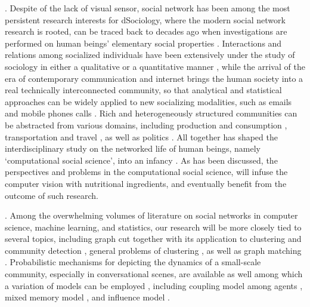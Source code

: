.  Despite of the lack of visual sensor, social network has been among the most persistent research interests for dSociology, where the modern social network research is rooted, can be traced back to decades ago when investigations are performed on human beings' elementary social properties \cite{Darwin,Thomkins,Goffman,Kendon1990,Ekman,Hoyle,Tannen}. Interactions and relations among socialized individuals have been extensively under the study of sociology in either a qualitative or a quantitative manner \cite{Goodwin2000,Goldin,Goodwin2007,Kendon2010}, while the arrival of the era of contemporary communication and internet brings the human society into a real technically interconnected community, so that analytical and statistical approaches can be widely applied to new socializing modalities, such as emails \cite{Eckmann} and mobile phones calls \cite{Onnela,Eagle}. Rich and heterogeneously structured communities can be abstracted from various domains, including production and consumption \cite{Watts}, transportation and travel \cite{Gonzalez},  as well as politics \cite{Iacus}. All together has shaped the interdisciplinary study on the networked life of human beings, namely `computational social science', into an infancy \cite{Lazer2009}. As has been discussed, the perspectives and problems in the computational social science, will infuse the computer vision with nutritional ingredients, and eventually benefit from the outcome of such research. 

. Among the overwhelming volumes of literature on social networks in computer science, machine learning, and statistics, our research will be more closely tied to several topics, including graph cut \cite{Boykov:segmentation} together with its application to clustering and community detection \cite{Ng:spectral,Filippone:clustering}, general problems of clustering \cite{Xu:clustering}, as well as graph matching \cite{West:Graph,Caetano:graph}. Probabilistic mechanisms for depicting the dynamics of a small-scale community, especially in conversational scenes, are available as well \cite{Basu:meeting,Dong} among which a variation of models can be employed , including coupling model among agents \cite{Brand:CHMM}, mixed memory model \cite{Choudhury:MHMM}, and influence model \cite{Pan:influence}.

